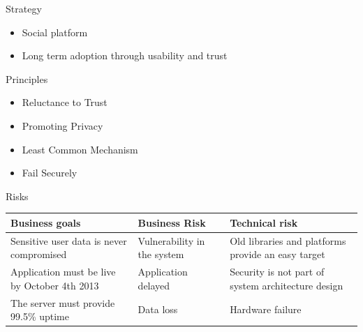 \documentclass{beamer}
\begin{document}
\begin{frame}
\Large
Strategy
\large
\begin{itemize}
\item
Social platform
\item
Long term adoption through usability and trust
\end{itemize}
\Large
Principles
\large
\begin{itemize}
\item 
Reluctance to Trust
\item
Promoting Privacy
\item
Least Common Mechanism
\item
Fail Securely
\end{itemize}
\end{frame}

\begin{frame}
\Large
Risks
\small
\begin{table}

	\begin{tabular}{| p{3cm} | p{2cm}| p{4cm} |}
    \hline
   	\textbf{Business goals} & \textbf{Business Risk} & \textbf{Technical risk} \\ \hline
	Sensitive user data is never compromised & Vulnerability in the system & Old libraries and platforms provide an easy target \\ \hline    Application must be live by October 4th 2013 & Application delayed &  Security is not part of system architecture design \\ \hline
    The server must provide 99.5\% uptime & Data loss &  Hardware failure \\ \hline
    \end{tabular}
\end{table}
\end{frame}
\end{document}
